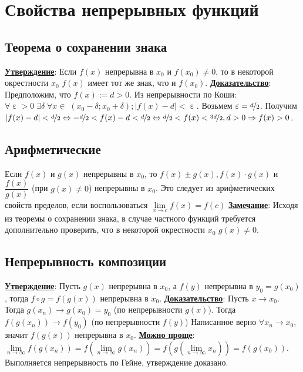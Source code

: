 \documentclass{article}
\DeclareMathOperator{\Exists}{\exists}
\DeclareMathOperator{\eps}{\varepsilon}
\DeclareMathOperator{\Forall}{\forall}
\newcommand\abs[1]{\left|#1\right|}
\begin{document}
\bigskip\bigskip
\section{Свойства непрерывных функций}
   \subsection*{Теорема о сохранении знака}
       \textbf{\underline{Утверждение}}: Если $f(x)$ непрерывна в $x_0$ и $f(x_0)\neq 0$, то в некоторой окрестности $x_0$ $f(x)$ имеет тот же знак, что и $f(x_0)$.\newline
       \textbf{\underline{Доказательство}}:
           Предположим, что $f(x) := d > 0$. \newline
           Из непрерывности по Коши: $\Forall\eps > 0\;\Exists\delta\;\Forall x\in\;(x_0 - \delta; x_0 + \delta);\abs{f(x) - d} < \eps$.\newline
           Возьмем $\eps = \nicefrac{d}{2}$. Получим $\abs{f(x) - d} < \nicefrac{d}{2} \Leftrightarrow -\nicefrac{d}{2} < f(x) - d < \nicefrac{d}{2} \Leftrightarrow \nicefrac{d}{2} < f(x) < \nicefrac{3d}{2}, d > 0 \Rightarrow f(x) > 0$.
   \subsection*{Арифметические}
       Если $f(x)$ и $g(x)$ непрерывны в $x_0$, то $f(x)\pm g(x), f(x)\cdot g(x)$ и $\dfrac{f(x)}{g(x)}$ (при $g(x)\neq 0$) непрерывны в $x_0$. Это следует из арифметических свойств пределов, если воспользоваться $\lim\limits_{x\to c} f(x) = f(c)$
       \textbf{\underline{Замечание}}:
           Исходя из теоремы о сохранении знака, в случае частного функций требуется дополнительно проверить, что в некоторой окрестности $x_0$ $g(x) \neq 0$.
           
   \subsection*{Непрерывность композиции}
       \textbf{\underline{Утверждение}}: Пусть $g(x)$ непрерывна в $x_0$, а $f(y)$ непрерывна в $y_0 = g(x_0)$, тогда $f\circ g = f(g(x))$ непрерывна в $x_0$. \newline
       \textbf{\underline{Доказательство}}: Пусть $x\to x_0$. Тогда $g(x_n)\to g(x_0) = y_0$ (по непрерывности $g(x)$). \newline
       Тогда $f(g(x_n))\to f(y_0)$ (по непрерывности $f(y)$) \newline
       Написанное верно $\Forall x_n\to x_0$, значит $f(g(x))$ непрерывна в $x_0$.\newline\newline
       \textbf{\underline{Можно проще}}: $\lim\limits_{n\to\infty} f(g(x_n)) = f(\lim\limits_{n\to\infty} g(x_n)) = f(g(\lim\limits_{n\to\infty} x_n)) = f(g(x_0))$. Выполняется непрерывность по Гейне, утверждение доказано.
       
\end{document}
